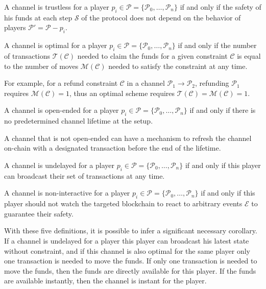 \begin{definition}[Trustless]
  A channel is trustless for a player $p_i \in \mathcal{P} = \{\mathcal{P}_0,
  \dots, \mathcal{P}_n\}$ if and only if the safety of his funds at each step
  $\mathcal{S}$ of the protocol does not depend on the behavior of players $\mathcal{P}' =
  \mathcal{P} - p_i$.
\end{definition}

\begin{definition}[Optimal]
  A channel is optimal for a player $p_i \in \mathcal{P} = \{\mathcal{P}_0, \dots,
  \mathcal{P}_n\}$ if and only if the number of transactions
  $\mathcal{T}(\mathcal{C})$ needed to claim the funds for a given constraint
  $\mathcal{C}$ is equal to the number of moves $\mathcal{M}(\mathcal{C})$ needed
  to satisfy the constraint at any time.
\end{definition}

For example, for a refund constraint $\mathcal{C}$ in a channel $\mathcal{P}_1 \rightarrow \mathcal{P}_2$,
refunding $\mathcal{P}_1$ requires $\mathcal{M}(\mathcal{C}) = 1$, thus
an optimal scheme requires $\mathcal{T}(\mathcal{C}) = \mathcal{M}(\mathcal{C}) = 1$.

\begin{definition}
  A channel is open-ended for a player $p_i \in \mathcal{P} = \{\mathcal{P}_0,
  \dots, \mathcal{P}_n\}$ if and only if there is no predetermined channel
  lifetime at the setup.
\end{definition}

A channel that is not open-ended can have a mechanism to refresh the channel
on-chain with a designated transaction before the end of the lifetime.

\begin{definition}[Undelayed]
  A channel is undelayed for a player $p_i \in \mathcal{P} = \{\mathcal{P}_0,
  \dots, \mathcal{P}_n\}$ if and only if this player can broadcast their set of
  transactions at any time.
\end{definition}

\begin{definition}
  A channel is non-interactive for a player $p_i \in \mathcal{P} =
  \{\mathcal{P}_0, \dots, \mathcal{P}_n\}$ if and only if this player should not
  watch the targeted blockchain to react to arbitrary events $\mathcal{E}$ to
  guarantee their safety.
\end{definition}

With these five definitions, it is possible to infer a significant necessary
corollary. If a channel is undelayed for a player this player can broadcast his
latest state without constraint, and if this channel is also optimal for the
same player only one transaction is needed to move the funds. If only one
transaction is needed to move the funds, then the funds are directly available
for this player. If the funds are available instantly, then the channel is
instant for the player.


